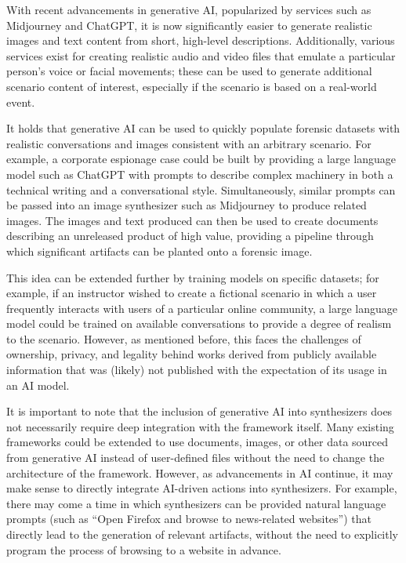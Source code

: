 \documentclass[letterpaper,12pt]{report}
\begin{document}
With recent advancements in generative AI, popularized by services such
as Midjourney and ChatGPT, it is now significantly easier to generate
realistic images and text content from short, high-level descriptions.
Additionally, various services exist for creating realistic audio and
video files that emulate a particular person's voice or facial
movements; these can be used to generate additional scenario content of
interest, especially if the scenario is based on a real-world event.

It holds that generative AI can be used to quickly populate forensic
datasets with realistic conversations and images consistent with an
arbitrary scenario. For example, a corporate espionage case could be
built by providing a large language model such as ChatGPT with prompts
to describe complex machinery in both a technical writing and a
conversational style. Simultaneously, similar prompts can be passed into
an image synthesizer such as Midjourney to produce related images. The
images and text produced can then be used to create documents describing
an unreleased product of high value, providing a pipeline through which
significant artifacts can be planted onto a forensic image.

This idea can be extended further by training models on specific
datasets; for example, if an instructor wished to create a fictional
scenario in which a user frequently interacts with users of a particular
online community, a large language model could be trained on available
conversations to provide a degree of realism to the scenario. However,
as mentioned before, this faces the challenges of ownership, privacy,
and legality behind works derived from publicly available information
that was (likely) not published with the expectation of its usage in an
AI model.

It is important to note that the inclusion of generative AI into
synthesizers does not necessarily require deep integration with the
framework itself. Many existing frameworks could be extended to use
documents, images, or other data sourced from generative AI instead of
user-defined files without the need to change the architecture of the
framework. However, as advancements in AI continue, it may make sense to
directly integrate AI-driven actions into synthesizers. For example,
there may come a time in which synthesizers can be provided natural
language prompts (such as ``Open Firefox and browse to news-related
websites'') that directly lead to the generation of relevant artifacts,
without the need to explicitly program the process of browsing to a
website in advance.
\end{document}
